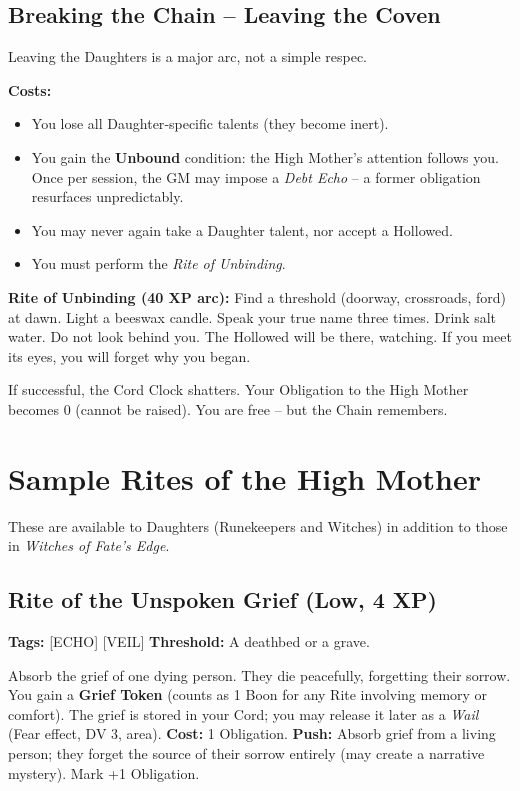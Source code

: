 \documentclass[10pt,twoside]{book}
\begin{document}
\section{Breaking the Chain – Leaving the Coven}
Leaving the Daughters is a major arc, not a simple respec.

\textbf{Costs:}
\begin{itemize}
\item You lose all Daughter‑specific talents (they become inert).
\item You gain the \textbf{Unbound} condition: the High Mother's attention follows you. Once per session, the GM may impose a \textit{Debt Echo} – a former obligation resurfaces unpredictably.
\item You may never again take a Daughter talent, nor accept a Hollowed.
\item You must perform the \textit{Rite of Unbinding}.
\end{itemize}

\textbf{Rite of Unbinding (40 XP arc):} Find a threshold (doorway, crossroads, ford) at dawn. Light a beeswax candle. Speak your true name three times. Drink salt water. Do not look behind you. The Hollowed will be there, watching. If you meet its eyes, you will forget why you began.

If successful, the Cord Clock shatters. Your Obligation to the High Mother becomes 0 (cannot be raised). You are free – but the Chain remembers.

\chapter{Sample Rites of the High Mother}
These are available to Daughters (Runekeepers and Witches) in addition to those in \textit{Witches of Fate's Edge}.

\section{Rite of the Unspoken Grief (Low, 4 XP)}
\textbf{Tags:} [ECHO] [VEIL]  \textbf{Threshold:} A deathbed or a grave.

Absorb the grief of one dying person. They die peacefully, forgetting their sorrow. You gain a \textbf{Grief Token} (counts as 1 Boon for any Rite involving memory or comfort). The grief is stored in your Cord; you may release it later as a \textit{Wail} (Fear effect, DV 3, area). \textbf{Cost:} 1 Obligation. \textbf{Push:} Absorb grief from a living person; they forget the source of their sorrow entirely (may create a narrative mystery). Mark +1 Obligation.
\end{document}
